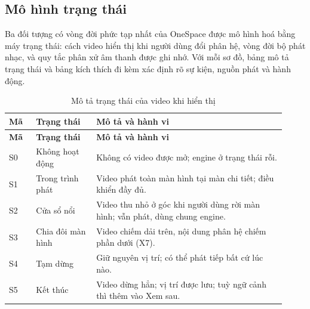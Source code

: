 \subsection{Mô hình trạng thái}
\label{sec:state-charts}

Ba đối tượng có vòng đời phức tạp nhất của OneSpace được mô hình hoá bằng máy trạng thái: cách video hiển thị khi người dùng đổi phân hệ, vòng đời bộ phát nhạc, và quy tắc phân xử âm thanh được ghi nhớ. Với mỗi sơ đồ, bảng mô tả trạng thái và bảng kích thích đi kèm xác định rõ sự kiện, nguồn phát và hành động.



\begingroup\small\renewcommand{\arraystretch}{1.12}\setlength{\tabcolsep}{3pt}
\begin{longtable}{>{\RaggedRight\arraybackslash}p{0.09\linewidth}>{\RaggedRight\arraybackslash}p{0.20\linewidth}>{\RaggedRight\arraybackslash}p{0.63\linewidth}}
\caption{Mô tả trạng thái của video khi hiển thị}
\label{tab:state-video}\\
\toprule
\textbf{Mã} & \textbf{Trạng thái} & \textbf{Mô tả và hành vi} \\
\midrule
\endfirsthead
\toprule
\textbf{Mã} & \textbf{Trạng thái} & \textbf{Mô tả và hành vi} \\
\midrule
\endhead
\bottomrule
\endfoot
S0 & Không hoạt động & Không có video được mở; engine ở trạng thái rỗi. \\
S1 & Trong trình phát & Video phát toàn màn hình tại màn chi tiết; điều khiển đầy đủ. \\
S2 & Cửa sổ nổi & Video thu nhỏ ở góc khi người dùng rời màn hình; vẫn phát, dùng chung engine. \\
S3 & Chia đôi màn hình & Video chiếm dải trên, nội dung phân hệ chiếm phần dưới (X7). \\
S4 & Tạm dừng & Giữ nguyên vị trí; có thể phát tiếp bất cứ lúc nào. \\
S5 & Kết thúc & Video dừng hẳn; vị trí được lưu; tuỳ ngữ cảnh thì thêm vào Xem sau. \\
\end{longtable}

